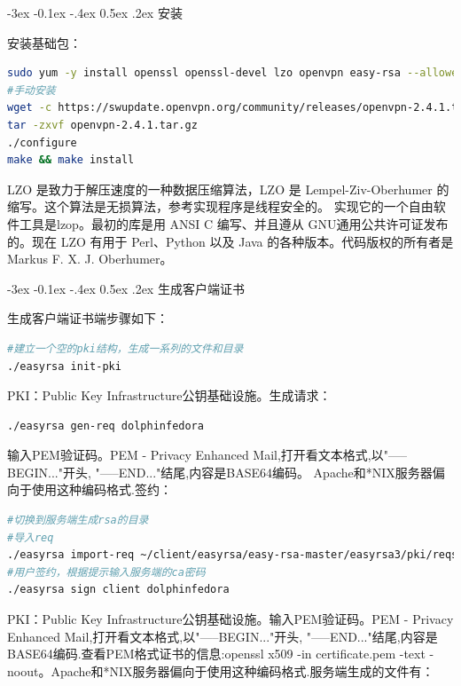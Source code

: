 \documentclass[11pt,fleqn]{book}
\makeatletter
\numberwithin{dummy}{section}
\theoremstyle{ocrenumbox}
\theoremstyle{blacknumex}
\theoremstyle{blacknumbox}
\theoremstyle{ocrenum}
\renewcommand{\subsection}{\@startsection {subsection}{2}{\z@}
	{-3ex \@plus -0.1ex \@minus -.4ex}
	{0.5ex \@plus.2ex }
	{\normalfont\sffamily\bfseries}}
\makeatother
\begin{document}
\subsection{安装}

安装基础包：

\begin{lstlisting}[language=bash]
sudo yum -y install openssl openssl-devel lzo openvpn easy-rsa --allowerasing
#手动安装
wget -c https://swupdate.openvpn.org/community/releases/openvpn-2.4.1.tar.gz
tar -zxvf openvpn-2.4.1.tar.gz
./configure
make && make install
\end{lstlisting}

LZO 是致力于解压速度的一种数据压缩算法，LZO 是 Lempel-Ziv-Oberhumer 的缩写。这个算法是无损算法，参考实现程序是线程安全的。 实现它的一个自由软件工具是lzop。最初的库是用 ANSI C 编写、并且遵从 GNU通用公共许可证发布的。现在 LZO 有用于 Perl、Python 以及 Java 的各种版本。代码版权的所有者是 Markus F. X. J. Oberhumer。

\subsection{生成客户端证书}

生成客户端证书端步骤如下：

\begin{lstlisting}[language=Bash]
#建立一个空的pki结构，生成一系列的文件和目录
./easyrsa init-pki
\end{lstlisting}

PKI：Public Key Infrastructure公钥基础设施。生成请求：

\begin{lstlisting}[language=Bash]
./easyrsa gen-req dolphinfedora
\end{lstlisting}

输入PEM验证码。PEM - Privacy Enhanced Mail,打开看文本格式,以"-----BEGIN..."开头, "-----END..."结尾,内容是BASE64编码。
Apache和*NIX服务器偏向于使用这种编码格式.签约：

\begin{lstlisting}[language=Bash]
#切换到服务端生成rsa的目录
#导入req
./easyrsa import-req ~/client/easyrsa/easy-rsa-master/easyrsa3/pki/reqs/dolphinfedora.req dolphinfedora
#用户签约，根据提示输入服务端的ca密码
./easyrsa sign client dolphinfedora
\end{lstlisting}

PKI：Public Key Infrastructure公钥基础设施。输入PEM验证码。PEM - Privacy Enhanced Mail,打开看文本格式,以"-----BEGIN..."开头, "-----END..."结尾,内容是BASE64编码.查看PEM格式证书的信息:openssl x509 -in certificate.pem -text -noout。Apache和*NIX服务器偏向于使用这种编码格式.服务端生成的文件有：
\end{document}
